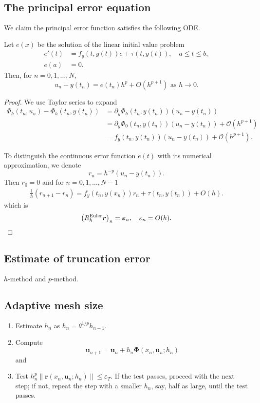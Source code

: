 \documentclass[10pt]{amsart}
\begin{document}
\subsection{The principal error equation}
We claim the principal error function satisfies the following ODE.
\begin{theorem}
Let $e(x)$ be the solution of the linear initial value problem
$$
\begin{aligned}
e'(t)& =f_y(t, {y}(t)) e+{\tau}(t, {y}(t)), \quad a \leq t \leq b, \\
e(a) & = 0.
\end{aligned}
$$
Then, for $n=0,1, \ldots, N$,
$$
{u}_n-{y}\left(t_n\right)=e\left(t_n\right) h^p+O\left(h^{p+1}\right) \text { as } h \rightarrow 0.
$$
\end{theorem}
\begin{proof}
We use Taylor series to expand
$$
\begin{aligned}
\Phi_h(t_n, u_n) - \Phi_h(t_n, y(t_n)) &= \partial_y\Phi_h(t_n, y(t_n))( u_n - y(t_n))\\
&= \partial_y\Phi_0(t_n, y(t_n))( u_n - y(t_n)) + \mathcal O(h^{p+1})\\
&= f_y(t_n, y(t_n))( u_n - y(t_n)) + \mathcal O(h^{p+1}).
\end{aligned}
$$

To distinguish the continuous error function $e(t)$ with its numerical approximation, we denote
$$
r_n = h^{-p} ({u}_n-{y}\left(t_n\right)). 
$$
Then $r_0 = 0$ and for $n=0,1, \ldots, N-1$
$$
\begin{gathered}
\frac{1}{h}\left(r_{n+1}-r_n\right)=f_y\left(t_n, {y}\left(x_n\right)\right) r_n+{\tau}\left(t_n, {y}\left(t_n\right)\right)+O(h).
\end{gathered}
$$
which is
$$
\left(R_h^{\text {Euler}} \boldsymbol r\right)_n=\boldsymbol{\varepsilon}_n, \quad  \varepsilon_n=O(h).
$$
\end{proof}

\subsection{Estimate of truncation error}
$h$-method and $p$-method.

\subsection{Adaptive mesh size}
\begin{enumerate}
 \item Estimate $h_n$ as $h_n = \theta^{1/p}h_{n-1}$.
\item Compute 
$$\boldsymbol{u}_{n+1}=\boldsymbol{u}_n+h_n \boldsymbol{\Phi}\left(x_n, \boldsymbol{u}_n ; h_n\right)$$ and 
\item Test $h_n^p\left\|\boldsymbol{r}\left(x_n, \boldsymbol{u}_n ; h_n\right)\right\| \leq \varepsilon_T$. If the test passes, proceed with the next step; if not, repeat the step with a smaller $h_n$, say, half as large, until the test passes.
\end{enumerate}
\end{document}
